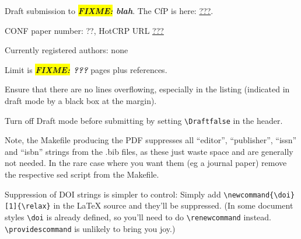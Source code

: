 \documentclass[10pt,conference,compsoc\ifDraft,draft\fi]{IEEEtran}
\newcommand{\FIXME}[1]{\textbf{\textsl{\colorbox{yellow}{FIXME:} #1}}}
\newcommand{\FIXME}[1]{\relax}
\begin{document}
  \renewcommand{\sectionautorefname}{Section}
  \renewcommand{\subsectionautorefname}{Section}
  \renewcommand{\subsubsectionautorefname}{Section}
  \renewcommand{\appendixautorefname}{Appendix}
  \renewcommand{\Hfootnoteautorefname}{Footnote}
  \newcommand{\Htextbf}[1]{\textbf{\hyperpage{#1}}}

\ifACM\ifReview\else
  \ifAuthorversion
    \makeatletter
    \def\@formatdoi#1{\url{https://doi.org/#1}\vspace*{2ex}}
    \makeatother
  \fi
\fi\fi

\ifDraft
Draft submission to \FIXME{blah}. The CfP is here:
\url{???}.

CONF paper number: ??, HotCRP URL \url{???}

Currently registered authors: none

Limit is \FIXME{???} pages plus references.

Ensure that there are no lines overflowing, especially in the listing
(indicated in draft mode by a black box at the margin).

Turn off Draft mode before submitting by setting  \verb,\Draftfalse, in the header.

Note, the Makefile producing the PDF suppresses all ``editor'',
``publisher'', ``issn'' and ``isbn'' strings from the .bib files, as
these just waste space and are generally not needed. In the rare
case where you want them (eg a journal paper) remove the respective
sed script from the Makefile.

Suppression of DOI strings is simpler to control: Simply add
\verb|\newcommand{\doi}[1]{\relax}| in the \LaTeX{} source and
they'll be suppressed. (In some document styles \verb|\doi| is
already defined, so you'll need to do \verb|\renewcommand|
instead. \verb|\providescommand| is unlikely to bring you joy.)

\clearpage
\addtocounter{page}{-1}
\makeatletter
\ACM@linecount\@ne\relax
\makeatother
\fi
\end{document}
